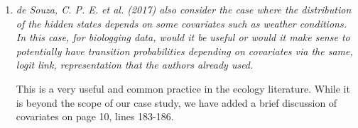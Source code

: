 \documentclass{article}
\begin{document}
\begin{enumerate}
    \item \textit{de Souza, C. P. E. et al. (2017) also consider the case where the distribution of the hidden states depends on some covariates such as weather conditions. In this case, for biologging data, would it be useful or would it make sense to potentially have transition probabilities depending on covariates via the same, logit link, representation that the authors already used.}
    
    This is a very useful and common practice in the ecology literature. While it is beyond the scope of our case study, we have added a brief discussion of covariates on page 10, lines 183-186.
    
\end{enumerate}
\end{document}
